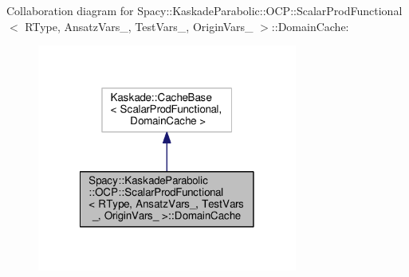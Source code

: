 Collaboration diagram for Spacy\-:\-:Kaskade\-Parabolic\-:\-:O\-C\-P\-:\-:Scalar\-Prod\-Functional$<$ R\-Type, Ansatz\-Vars\-\_\-, Test\-Vars\-\_\-, Origin\-Vars\-\_\- $>$\-:\-:Domain\-Cache\-:
\nopagebreak
\begin{figure}[H]
\begin{center}
\leavevmode
\includegraphics[width=242pt]{classSpacy_1_1KaskadeParabolic_1_1OCP_1_1ScalarProdFunctional_1_1DomainCache__coll__graph}
\end{center}
\end{figure}
